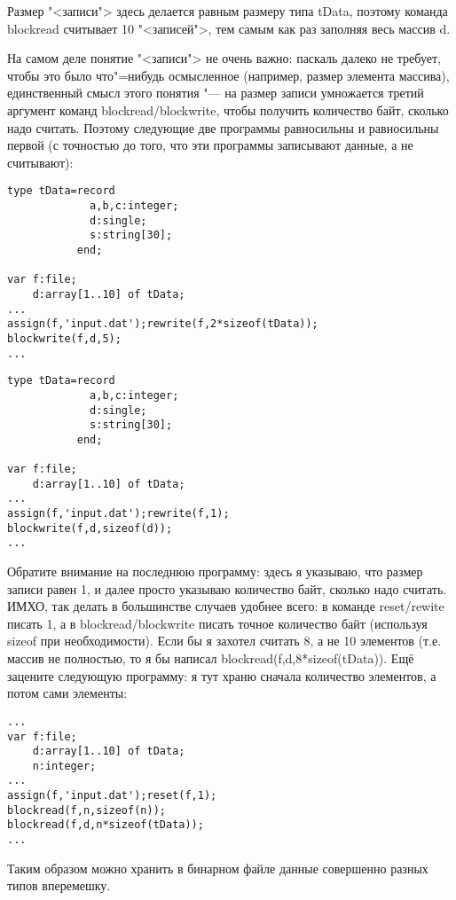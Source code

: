 Размер "<записи"> здесь делается равным размеру типа tData, поэтому команда blockread считывает 10 
"<записей">, тем самым как раз заполняя весь массив d.

\pagebreak[3]

На самом деле понятие "<записи"> не очень важно: паскаль далеко не требует, чтобы это было 
что"=нибудь осмысленное (например, размер элемента массива), единственный смысл этого понятия "--- 
на размер записи умножается третий аргумент команд blockread/blockwrite, чтобы получить количество 
байт, сколько надо считать. Поэтому следующие две программы равносильны и равносильны первой (с 
точностью до того, что эти программы записывают данные, а не считывают):
\begin{codesample}\begin{verbatim}
type tData=record
             a,b,c:integer;
             d:single;
             s:string[30];
           end;
           
var f:file;
    d:array[1..10] of tData;
...  
assign(f,'input.dat');rewrite(f,2*sizeof(tData));
blockwrite(f,d,5);
...
\end{verbatim}
\end{codesample}
\begin{codesample}\begin{verbatim}
type tData=record
             a,b,c:integer;
             d:single;
             s:string[30];
           end;
           
var f:file;
    d:array[1..10] of tData;
...  
assign(f,'input.dat');rewrite(f,1);
blockwrite(f,d,sizeof(d));
...
\end{verbatim}
\end{codesample}

Обратите внимание на последнюю программу: здесь я указываю, что размер записи равен 1, и далее 
просто указываю количество байт, сколько надо считать. ИМХО, так делать в большинстве случаев 
удобнее всего: в команде reset/rewite писать 1, а в blockread/blockwrite писать точное количество 
байт (используя sizeof при необходимости). Если бы я захотел считать 8, а не 10 элементов (т.е. 
массив не полностью, то я бы написал blockread(f,d,8*sizeof(tData)). Ещё зацените следующую 
программу: я тут храню сначала количество элементов, а потом сами элементы:
\begin{codesample}\begin{verbatim}
...
var f:file;
    d:array[1..10] of tData;
    n:integer;
...  
assign(f,'input.dat');reset(f,1);
blockread(f,n,sizeof(n));
blockread(f,d,n*sizeof(tData));
...
\end{verbatim}
\end{codesample}
Таким образом можно хранить в бинарном файле данные совершенно разных типов вперемешку.

